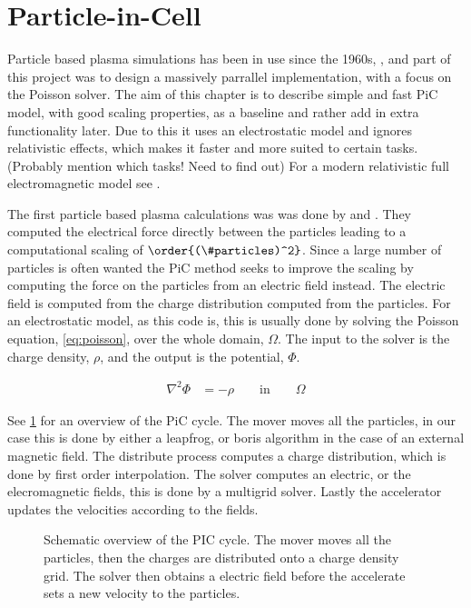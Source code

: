 \section{Particle-in-Cell}

    Particle based plasma simulations has been in use since the 1960s, \citep{verboncoeur_particle_2005},
    and part of this project was to design a massively parrallel implementation,
    with a focus on the Poisson solver.
    The aim of this chapter is to describe simple and fast PiC model, with good scaling properties, as a baseline
    and rather add in extra functionality later. Due to this it uses an electrostatic model and
    ignores relativistic effects, which makes it faster and more suited to certain tasks.
    (Probably mention which tasks! Need to find out)
    For a modern relativistic full electromagnetic model see
    \citet{sgattoni_piccante:_2015}.

    The first particle based plasma calculations was
    was done by \cite{dawson_one-dimensional_1962} and \citet{buneman_dissipation_1959}.
    They computed the electrical force directly between the particles leading
    to a computational scaling of \(\order{(\#particles)^2}\).
    Since a large number of particles is often wanted the PiC method seeks to improve
    the scaling by computing the force on the particles from an electric field instead.
    The electric field is computed from the charge distribution computed from the
    particles. For an electrostatic model, as this code is, this is usually done by solving the Poisson
    equation, \cref{eq:poisson}, over the whole domain, \(\Omega\).
    The input to the solver is the charge density, \(\rho\), and the output is the potential, \(\Phi\).

    \begin{align}
        \nabla ^2 \Phi &= -\rho \qquad \text{in} \qquad \Omega \label{eq:poisson}
    \end{align}

    See \cref{fig:schematic} for an overview of the PiC cycle.
    The mover moves all the particles, in our case this is done by either a
    leapfrog, or boris algorithm in the case of an external magnetic field.
    The distribute process computes a charge distribution, which is done by first
    order interpolation.
    The solver computes an electric, or the elecromagnetic fields, this is done by
    a multigrid solver.
    Lastly the accelerator updates the velocities according to the fields.

    \begin{figure}
        \center
        
        \caption{Schematic overview of the PIC cycle. The mover moves all the particles,
        then the charges are distributed onto a charge density grid. The solver then
        obtains a electric field before the accelerate sets a new velocity to the particles.}
        \label{fig:schematic}
    \end{figure}

